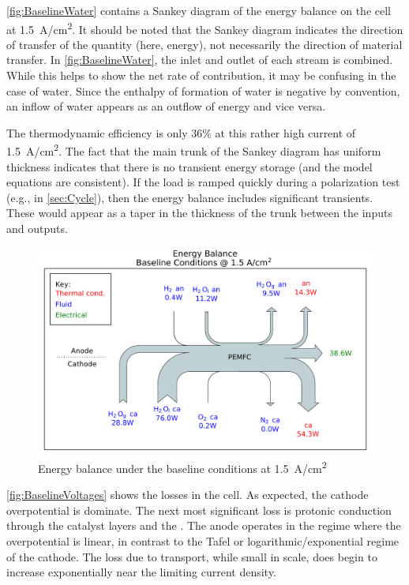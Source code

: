 \autoref{fig:BaselineWater} contains a Sankey diagram of the energy balance on the cell at \SI{1.5}{A/cm^2}.  It should be noted that the Sankey diagram indicates the direction of transfer of the quantity (here, energy), not necessarily the direction of material transfer.  In \autoref{fig:BaselineWater}, the inlet and outlet of each stream is combined.  While this helps to show the net rate of contribution, it may be confusing in the case of water.  Since the enthalpy of formation of water is negative by convention, an inflow of water appears as an outflow of energy and vice versa.

The thermodynamic efficiency is only 36\% at this rather high current of \SI{1.5}{A/cm^2}.
The fact that the main trunk of the Sankey diagram has uniform  thickness indicates that there is no transient energy storage (and the model equations are consistent).  If the load is ramped quickly during a polarization test (e.g., in \autoref{sec:Cycle}), then the energy balance includes significant transients.  These would appear as a taper in the thickness of the trunk between the inputs and outputs.

\begin{figure}[htbp]
  \includegraphics[width=\linewidth]{Results/Cell/Model/1/Energy}%
  \caption{Energy balance under the baseline conditions at \SI{1.5}{A/cm^2}}%
  \label{fig:BaselineEnergy}
\end{figure}

\autoref{fig:BaselineVoltages} shows the losses in the cell.  As expected, the cathode overpotential is dominate.  The next most significant loss is protonic conduction through the catalyst layers and the .  The anode operates in the regime where the overpotential is linear, in contrast to the Tafel or logarithmic\slash{}exponential regime of the cathode.  The loss due to  transport, while small in scale, does begin to increase exponentially near the limiting current density.

